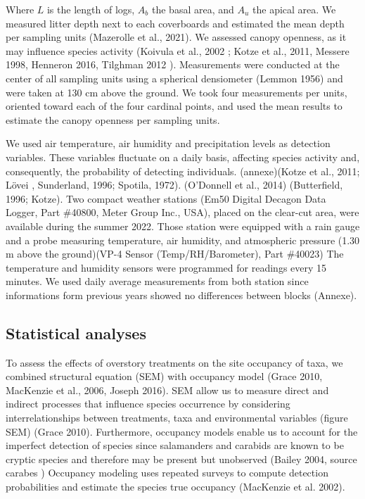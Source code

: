 Where $L$ is the length of logs, $A_b$ the basal area, and $A_u$ the apical area.
We measured litter depth next to each coverboards and estimated the mean depth per sampling units (Mazerolle et al., 2021). 
We assessed canopy openness, as it may influence species activity (Koivula et al., 2002 ; Kotze et al., 2011, Messere 1998, Henneron 2016, Tilghman 2012 ).
Measurements were conducted at the center of all sampling units using a spherical densiometer (Lemmon 1956) and were taken at 130 cm above the ground. 
We took four measurements per units, oriented toward each of the four cardinal points, and used the mean results to estimate the canopy openness per sampling units.

We used air temperature, air humidity and precipitation levels as detection variables.
These variables fluctuate on a daily basis, affecting species activity and, consequently, the probability of detecting individuals. 
(annexe)(Kotze et al., 2011; Lövei , Sunderland, 1996; Spotila, 1972). (O’Donnell et al., 2014) (Butterfield, 1996; Kotze). %
Two compact weather stations (Em50 Digital Decagon Data Logger, Part \#40800, Meter Group Inc., USA), placed on the clear-cut area, were available during the summer 2022.
Those station were equipped with a rain gauge and a probe measuring temperature, air humidity, and atmospheric pressure (1.30 m above the ground)(VP-4 Sensor (Temp/RH/Barometer), Part \#40023)
The temperature and humidity sensors were programmed for readings every 15 minutes. 
We used daily average measurements from both station since informations form previous years showed no differences between blocks (Annexe).



\subsection*{Statistical analyses}
\label{subsec:analyses}

To assess the effects of overstory treatments on the site occupancy of taxa, we combined structural equation (SEM) with occupancy model (Grace 2010,  MacKenzie et al., 2006, Joseph 2016).
SEM allow us to measure direct and indirect processes that influence species occurrence by considering interrelationships between treatments, taxa and environmental variables (figure SEM) (Grace 2010).
Furthermore, occupancy models enable us to account for the imperfect detection of species since salamanders and carabids are known to be cryptic species and therefore may be present but unobserved (Bailey 2004, source carabes )
Occupancy modeling uses repeated surveys to compute detection probabilities and estimate the species true occupancy (MacKenzie et al. 2002).


